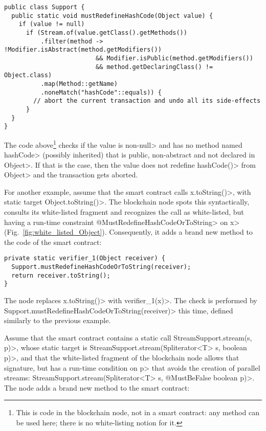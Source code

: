 {\small\begin{verbatim}
public class Support {
  public static void mustRedefineHashCode(Object value) {
    if (value != null)
      if (Stream.of(value.getClass().getMethods())
          .filter(method -> !Modifier.isAbstract(method.getModifiers())
                         && Modifier.isPublic(method.getModifiers())
                         && method.getDeclaringClass() != Object.class)
          .map(Method::getName)
          .noneMatch("hashCode"::equals)) {
        // abort the current transaction and undo all its side-effects
      }
  }
}
\end{verbatim}}

\noindent
The code above\footnote{This is code in the blockchain node, not in a smart contract:
  any method can be used here; there is no white-listing notion for it.}
checks if the value is non-\<null> and has no method
named \<hashCode>
(possibly inherited) that is public, non-abstract and not declared in \<Object>.
If that is the case, then the value does not redefine \<hashCode()> from \<Object>
and the transaction gets aborted.

For another example, assume that the smart contract calls
\<x.toString()>, with static target \<Object.toString()>.
The blockchain node spots this syntactically,
consults its white-listed fragment and recognizes the call as
white-listed, but having a run-time constraint \<@MustRedefineHashCodeOrToString> on
\<x> (Fig.~\ref{fig:white_listed_Object}).
Consequently, it adds a brand new method to the code of the smart contract:

{\small\begin{verbatim}
private static verifier_1(Object receiver) {
  Support.mustRedefineHashCodeOrToString(receiver);
  return receiver.toString();
}
\end{verbatim}}

\noindent
The node replaces \<x.toString()> with \<verifier\_1(x)>.
The check is performed by \<Support.mustRedefineHashCodeOrToString(receiver)> this time,
defined similarly to the previous example.

Assume that the smart contract contains a static call
\<StreamSupport.stream(s, p)>, whose static target is
\<StreamSupport.stream(Spliterator$\text{<}$T$\text{>}$ s, boolean p)>,
and that the white-listed fragment of the blockchain node allows that signature,
but has a run-time condition on \<p> that avoids the creation of parallel streams:
\<StreamSupport.stream(Spliterator$\text{<}$T$\text{>}$ s, @MustBeFalse boolean p)>.
The node adds a brand new method to the smart contract:

